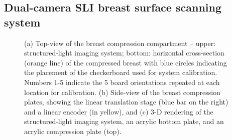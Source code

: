 \subsection{Dual-camera SLI breast surface scanning system}
\label{sec:sli}
\begin{figure}
	\begin{center}
	\end{center}
	\caption{ (a) Top-view of the breast compression compartment -- upper: structured-light imaging system; bottom: horizontal cross-section (orange line) of the compressed breast with blue circles indicating the placement of the checkerboard used for system calibration. Numbers 1-5 indicate the 5 board orientations repeated at each location for calibration. (b) Side-view of the breast compression plates, showing the linear translation stage (blue bar on the right) and a linear encoder (in yellow), and  (c) 3-D rendering of the structured-light imaging system, an acrylic bottom plate, and an acrylic compression plate (top). } 
	\label{fig:mammographysetup}
\end{figure} 

